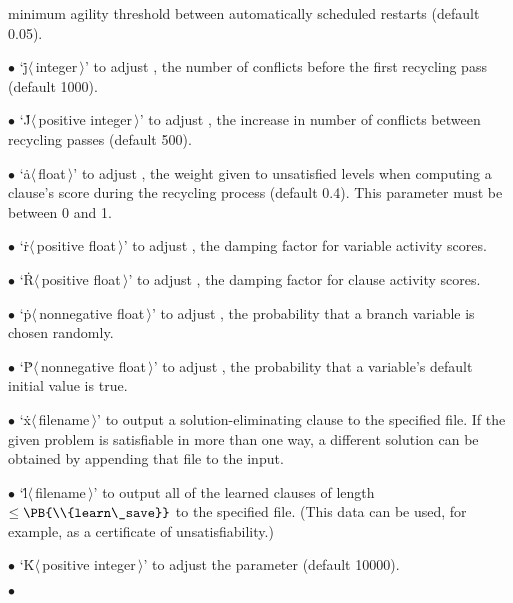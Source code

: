 minimum agility threshold between automatically scheduled restarts
(default 0.05).
\item{$\bullet$}
`\.j$\langle\,$integer$\,\rangle$' to adjust , the number
of
conflicts before the first recycling pass (default 1000).
\item{$\bullet$}
`\.J$\langle\,$positive integer$\,\rangle$' to adjust ,
the
increase in number of conflicts between recycling passes (default 500).
\item{$\bullet$}
`\.a$\langle\,$float$\,\rangle$' to adjust , the weight given to
unsatisfied levels when computing a clause's score during the recycling
process (default 0.4). This parameter must be between 0 and 1.
\item{$\bullet$}
`\.r$\langle\,$positive float$\,\rangle$' to adjust , the
damping factor for variable activity scores.
\item{$\bullet$}
`\.R$\langle\,$positive float$\,\rangle$' to adjust , the
damping factor for clause activity scores.
\item{$\bullet$}
`\.p$\langle\,$nonnegative float$\,\rangle$' to adjust , the
probability that a branch variable is chosen randomly.
\item{$\bullet$}
`\.P$\langle\,$nonnegative float$\,\rangle$' to adjust , the
probability that a variable's default initial value is true.
\item{$\bullet$}
`\.x$\langle\,$filename$\,\rangle$' to output a
solution-eliminating clause to the specified file. If the given problem is
satisfiable in more than one way, a different solution can be obtained by
appending that file to the input.
\item{$\bullet$}
`\.l$\langle\,$filename$\,\rangle$' to output all of the learned clauses
of length $\le \PB{\\{learn\_save}}$
to the specified file. (This data can be used, for example, as a certificate
of unsatisfiability.)
\item{$\bullet$}
`\.K$\langle\,$positive integer$\,\rangle$' to adjust the 
parameter (default 10000).
\item{$\bullet$}
